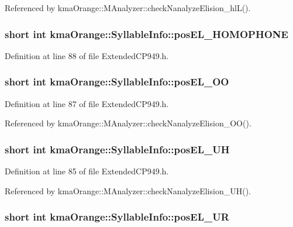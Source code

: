 Referenced by kmaOrange::MAnalyzer::checkNanalyzeElision\_\-hlL().\hypertarget{structkmaOrange_1_1SyllableInfo_7bd597a32af06f7b8dcf08ec37bdb7c6}{
\subsubsection[{posEL\_\-HOMOPHONE}]{\setlength{\rightskip}{0pt plus 5cm}short int {\bf kmaOrange::SyllableInfo::posEL\_\-HOMOPHONE}}}
\label{structkmaOrange_1_1SyllableInfo_7bd597a32af06f7b8dcf08ec37bdb7c6}




Definition at line 88 of file ExtendedCP949.h.\hypertarget{structkmaOrange_1_1SyllableInfo_6094f8b45ef8fb593bdf6ff07fee1814}{
\subsubsection[{posEL\_\-OO}]{\setlength{\rightskip}{0pt plus 5cm}short int {\bf kmaOrange::SyllableInfo::posEL\_\-OO}}}
\label{structkmaOrange_1_1SyllableInfo_6094f8b45ef8fb593bdf6ff07fee1814}




Definition at line 87 of file ExtendedCP949.h.

Referenced by kmaOrange::MAnalyzer::checkNanalyzeElision\_\-OO().\hypertarget{structkmaOrange_1_1SyllableInfo_0f4b431fc12d5cb188055862923bbfbe}{
\subsubsection[{posEL\_\-UH}]{\setlength{\rightskip}{0pt plus 5cm}short int {\bf kmaOrange::SyllableInfo::posEL\_\-UH}}}
\label{structkmaOrange_1_1SyllableInfo_0f4b431fc12d5cb188055862923bbfbe}




Definition at line 85 of file ExtendedCP949.h.

Referenced by kmaOrange::MAnalyzer::checkNanalyzeElision\_\-UH().\hypertarget{structkmaOrange_1_1SyllableInfo_7e5f47a330747e897d729b6d788a17cb}{
\subsubsection[{posEL\_\-UR}]{\setlength{\rightskip}{0pt plus 5cm}short int {\bf kmaOrange::SyllableInfo::posEL\_\-UR}}}
\label{structkmaOrange_1_1SyllableInfo_7e5f47a330747e897d729b6d788a17cb}




